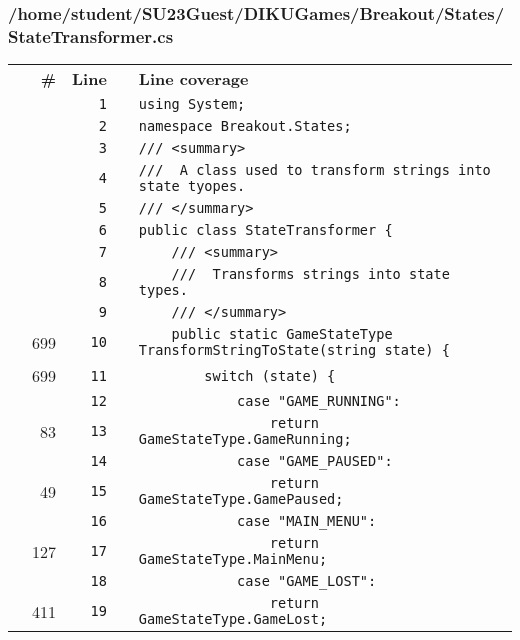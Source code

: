 \documentclass[a4paper,landscape,10pt]{article}
\begin{document}
\subsubsection{/home/student/SU23Guest/DIKUGames/Breakout/States/StateTransformer.cs}
\begin{longtable}[l]{lrrll}
\textbf{} & \textbf{\#} & \textbf{Line} & \textbf{} & \textbf{Line coverage}\\
\cellcolor{gray} &  & \verb~1~ & & \verb~using System;~\\
\cellcolor{gray} &  & \verb~2~ & & \verb~namespace Breakout.States;~\\
\cellcolor{gray} &  & \verb~3~ & & \verb~/// <summary>~\\
\cellcolor{gray} &  & \verb~4~ & & \verb~///  A class used to transform strings into state tyopes.~\\
\cellcolor{gray} &  & \verb~5~ & & \verb~/// </summary>~\\
\cellcolor{gray} &  & \verb~6~ & & \verb~public class StateTransformer {~\\
\cellcolor{gray} &  & \verb~7~ & & \verb~    /// <summary>~\\
\cellcolor{gray} &  & \verb~8~ & & \verb~    ///  Transforms strings into state types.~\\
\cellcolor{gray} &  & \verb~9~ & & \verb~    /// </summary>~\\
\cellcolor{green} & 699 & \verb~10~ & & \verb~    public static GameStateType TransformStringToState(string state) {~\\
\cellcolor{green} & 699 & \verb~11~ & & \verb~        switch (state) {~\\
\cellcolor{gray} &  & \verb~12~ & & \verb~            case "GAME_RUNNING":~\\
\cellcolor{green} & 83 & \verb~13~ & & \verb~                return GameStateType.GameRunning;~\\
\cellcolor{gray} &  & \verb~14~ & & \verb~            case "GAME_PAUSED":~\\
\cellcolor{green} & 49 & \verb~15~ & & \verb~                return GameStateType.GamePaused;~\\
\cellcolor{gray} &  & \verb~16~ & & \verb~            case "MAIN_MENU":~\\
\cellcolor{green} & 127 & \verb~17~ & & \verb~                return GameStateType.MainMenu;~\\
\cellcolor{gray} &  & \verb~18~ & & \verb~            case "GAME_LOST":~\\
\cellcolor{green} & 411 & \verb~19~ & & \verb~                return GameStateType.GameLost;~\\

\end{longtable}
\end{document}
